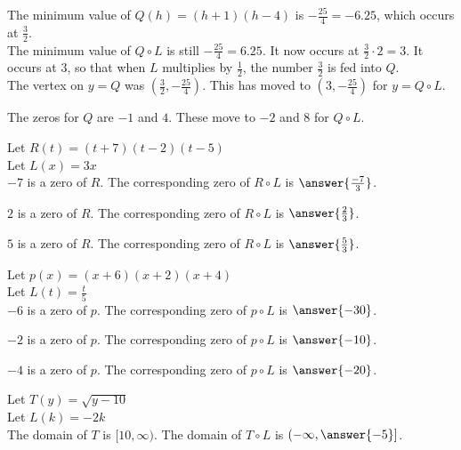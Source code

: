\documentclass{ximera}
\begin{document}
The minimum value of $Q(h) = (h+1)(h-4)$ is $-\frac{25}{4} = -6.25$, which occurs at $\frac{3}{2}$. \\

The minimum value of $Q \circ L$ is still $-\frac{25}{4} = 6.25$. It now occurs at $\frac{3}{2} \cdot 2 = 3$.  It occurs at $3$, so that when $L$ multiplies by $\frac{1}{2}$, the number $\frac{3}{2}$ is fed into $Q$. \\


The vertex on $y = Q$ was $\left (\frac{3}{2}, -\frac{25}{4} \right)$. This has moved to $\left (3, -\frac{25}{4} \right)$ for $y = Q \circ L$.


The zeros for $Q$ are $-1$ and $4$.  These move to $-2$ and $8$ for $Q \circ L$.  




\begin{question}


Let $R(t) = (t+7)(t-2)(t-5)$ \\

Let $L(x) = 3x$ \\


$-7$ is a zero of $R$.  The corresponding zero of $R \circ L$ is $\answer{\frac{-7}{3}}$.

$2$ is a zero of $R$.  The corresponding zero of $R \circ L$ is $\answer{\frac{2}{3}}$.

$5$ is a zero of $R$.  The corresponding zero of $R \circ L$ is $\answer{\frac{5}{3}}$.


\end{question}












\begin{question}


Let $p(x) = (x+6)(x+2)(x+4)$ \\

Let $L(t) = \frac{t}{5}$ \\


$-6$ is a zero of $p$.  The corresponding zero of $p \circ L$ is $\answer{-30}$.

$-2$ is a zero of $p$.  The corresponding zero of $p \circ L$ is $\answer{-10}$.

$-4$ is a zero of $p$.  The corresponding zero of $p \circ L$ is $\answer{-20}$.


\end{question}










\begin{question}


Let $T(y) = \sqrt{y-10}$ \\

Let $L(k) = -2k$ \\


The domain of $T$ is $[10, \infty)$.  The domain of $T \circ L$ is $\left( -\infty, \answer{-5} \right]$.


\end{question}
\end{document}
